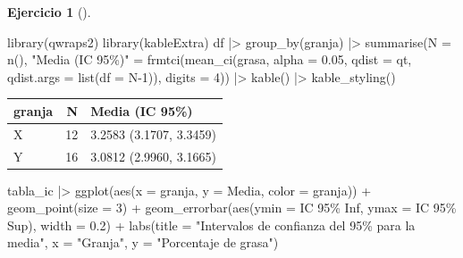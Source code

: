 \documentclass[
  a4paper,
]{scrreport}
\newenvironment{Shaded}{\begin{snugshade}}{\end{snugshade}}
\newcommand{\AttributeTok}[1]{\textcolor[rgb]{0.40,0.45,0.13}{#1}}
\newcommand{\DecValTok}[1]{\textcolor[rgb]{0.68,0.00,0.00}{#1}}
\newcommand{\FloatTok}[1]{\textcolor[rgb]{0.68,0.00,0.00}{#1}}
\newcommand{\FunctionTok}[1]{\textcolor[rgb]{0.28,0.35,0.67}{#1}}
\newcommand{\NormalTok}[1]{\textcolor[rgb]{0.00,0.23,0.31}{#1}}
\newcommand{\OtherTok}[1]{\textcolor[rgb]{0.00,0.23,0.31}{#1}}
\newcommand{\SpecialCharTok}[1]{\textcolor[rgb]{0.37,0.37,0.37}{#1}}
\newcommand{\StringTok}[1]{\textcolor[rgb]{0.13,0.47,0.30}{#1}}
\theoremstyle{definition}
\newtheorem{exercise}{Ejercicio}[chapter]
\theoremstyle{remark}
\begin{document}
\begin{exercise}[]
\begin{enumerate}
\begin{tcolorbox}
\begin{Shaded}
\begin{Highlighting}[]
\FunctionTok{library}\NormalTok{(qwraps2)}
\FunctionTok{library}\NormalTok{(kableExtra)}
\NormalTok{df }\SpecialCharTok{|\textgreater{}} 
    \FunctionTok{group\_by}\NormalTok{(granja)  }\SpecialCharTok{|\textgreater{}} 
    \FunctionTok{summarise}\NormalTok{(}\AttributeTok{N =} \FunctionTok{n}\NormalTok{(), }\StringTok{"Media (IC 95\%)"} \OtherTok{=} \FunctionTok{frmtci}\NormalTok{(}\FunctionTok{mean\_ci}\NormalTok{(grasa, }\AttributeTok{alpha =} \FloatTok{0.05}\NormalTok{, }\AttributeTok{qdist =}\NormalTok{ qt, }\AttributeTok{qdist.args =} \FunctionTok{list}\NormalTok{(}\AttributeTok{df =}\NormalTok{ N}\DecValTok{{-}1}\NormalTok{)), }\AttributeTok{digits =} \DecValTok{4}\NormalTok{))  }\SpecialCharTok{|\textgreater{}} 
    \FunctionTok{kable}\NormalTok{()  }\SpecialCharTok{|\textgreater{}} 
    \FunctionTok{kable\_styling}\NormalTok{()}
\end{Highlighting}
\end{Shaded}

  \begin{table}
  \centering
  \begin{tabular}{l|r|l}
  \hline
  granja & N & Media (IC 95\%)\\
  \hline
  X & 12 & 3.2583 (3.1707, 3.3459)\\
  \hline
  Y & 16 & 3.0812 (2.9960, 3.1665)\\
  \hline
  \end{tabular}
  \end{table}

\begin{Shaded}
\begin{Highlighting}[]
\NormalTok{tabla\_ic  }\SpecialCharTok{|\textgreater{}} 
    \FunctionTok{ggplot}\NormalTok{(}\FunctionTok{aes}\NormalTok{(}\AttributeTok{x =}\NormalTok{ granja, }\AttributeTok{y =}\NormalTok{ Media, }\AttributeTok{color =}\NormalTok{ granja)) }\SpecialCharTok{+}
    \FunctionTok{geom\_point}\NormalTok{(}\AttributeTok{size =} \DecValTok{3}\NormalTok{) }\SpecialCharTok{+}
    \FunctionTok{geom\_errorbar}\NormalTok{(}\FunctionTok{aes}\NormalTok{(}\AttributeTok{ymin =} \StringTok{\textasciigrave{}}\AttributeTok{IC 95\% Inf}\StringTok{\textasciigrave{}}\NormalTok{, }\AttributeTok{ymax =} \StringTok{\textasciigrave{}}\AttributeTok{IC 95\% Sup}\StringTok{\textasciigrave{}}\NormalTok{), }\AttributeTok{width =} \FloatTok{0.2}\NormalTok{) }\SpecialCharTok{+}
    \FunctionTok{labs}\NormalTok{(}\AttributeTok{title =} \StringTok{"Intervalos de confianza del 95\% para la media"}\NormalTok{, }\AttributeTok{x =} \StringTok{"Granja"}\NormalTok{, }\AttributeTok{y =} \StringTok{"Porcentaje de grasa"}\NormalTok{)}
\end{Highlighting}
\end{Shaded}


\end{tcolorbox}
\end{enumerate}
\end{exercise}
\end{document}
